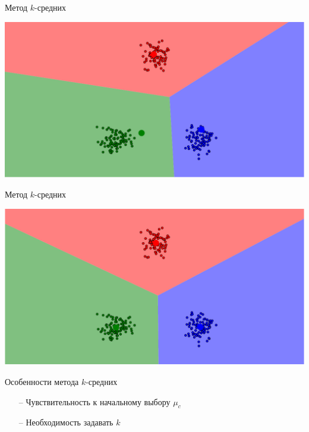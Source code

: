 \documentclass[10pt]{beamer}
\begin{document}
\begin{frame}{Метод $k$-средних}
	\begin{center}
	  \includegraphics[width= \textwidth, keepaspectratio = true]{images/kmeans3}   
	\end{center}
\end{frame}

\begin{frame}{Метод $k$-средних}
	\begin{center}
	  \includegraphics[width= \textwidth, keepaspectratio = true]{images/kmeans4}   
	\end{center}
\end{frame}

\begin{frame}{Особенности метода $k$-средних}
	\begin{itemize}
		\item[--] Чувствительность к начальному выбору $\mu_c$
		\item[--] Необходимость задавать $k$
	\end{itemize}
\end{frame}
\end{document}
